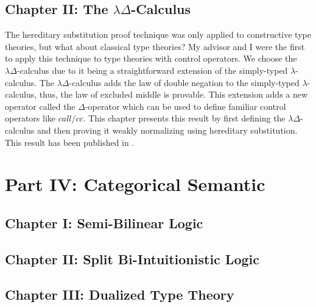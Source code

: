 \subsection{Chapter II: The $\lambda\Delta$-Calculus}
\label{subsec:the_lambdadelta-calculus}
The hereditary substitution proof technique was only applied to
constructive type theories, but what about classical type theories? My
advisor and I were the first to apply this technique to type theories
with control operators.  We choose the $\lambda\Delta$-calculus due to
it being a straightforward extension of the simply-typed
$\lambda$-calculus.  The $\lambda\Delta$-calculus adds the law of
double negation to the simply-typed $\lambda$-calculus, thus, the law
of excluded middle is provable.  This extension adds a new operator
called the $\Delta$-operator which can be used to define familiar
control operators like $call/cc$.  This chapter presents this result
by first defining the $\lambda\Delta$-calculus and then proving it
weakly normalizing using hereditary substitution.  This result has
been published in \cite{Eades:2013}.


\section{Part IV: Categorical Semantic }
\label{sec:categorical_semantics}

\subsection{Chapter I: Semi-Bilinear Logic}
\label{subsec:semi-bilinear_logic}


\subsection{Chapter II: Split Bi-Intuitionistic Logic}
\label{subsec:split_bi-intuitionistic_logic}


\subsection{Chapter III: Dualized Type Theory}
\label{subsubsec:dualized_type_theory}

